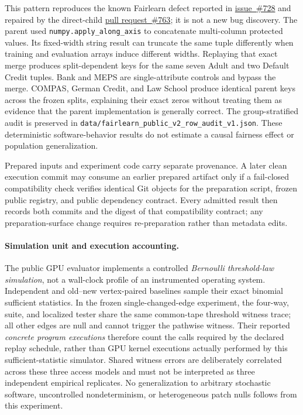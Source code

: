 This pattern reproduces the known Fairlearn defect reported in
\href{https://github.com/fairlearn/fairlearn/issues/728}{issue~\#728} and repaired
by the direct-child
\href{https://github.com/fairlearn/fairlearn/pull/763}{pull request~\#763}; it is
not a new bug discovery.  The parent used \texttt{numpy.apply\_along\_axis} to
concatenate multi-column protected values.  Its fixed-width string result can
truncate the same tuple differently when training and evaluation arrays induce
different widths.  Replaying that exact merge produces split-dependent keys for
the same seven Adult and two Default Credit tuples.  Bank and MEPS are
single-attribute controls and bypass the merge.  COMPAS, German Credit, and Law
School produce identical parent keys across the frozen splits, explaining their
exact zeros without treating them as evidence that the parent implementation is
generally correct.  The group-stratified audit is preserved in
\texttt{data/fairlearn\_public\_v2\_row\_audit\_v1.json}.  These deterministic
software-behavior results do not estimate a causal fairness effect or population
generalization.



Prepared inputs and experiment code carry separate provenance.  A later clean
execution commit may consume an earlier prepared artifact only if a fail-closed
compatibility check verifies identical Git objects for the preparation script,
frozen public registry, and public dependency contract.  Every admitted result
then records both commits and the digest of that compatibility contract; any
preparation-surface change requires re-preparation rather than metadata edits.

\paragraph{Simulation unit and execution accounting.}
The public GPU evaluator implements a controlled \emph{Bernoulli threshold-law
simulation}, not a wall-clock profile of an instrumented operating system.
Independent and old--new vertex-paired baselines sample their exact binomial
sufficient statistics. In the frozen single-changed-edge experiment, the
four-way, suite, and localized tester share the same common-tape threshold
witness trace; all other edges are null and cannot trigger the pathwise witness.
Their reported \emph{concrete program executions} therefore count the calls
required by the declared replay schedule, rather than GPU kernel executions
actually performed by this sufficient-statistic simulator. Shared witness
errors are deliberately correlated across these three access models and
must not be interpreted as three independent empirical replicates. No
generalization to arbitrary stochastic software, uncontrolled nondeterminism,
or heterogeneous patch nulls follows from this experiment.
